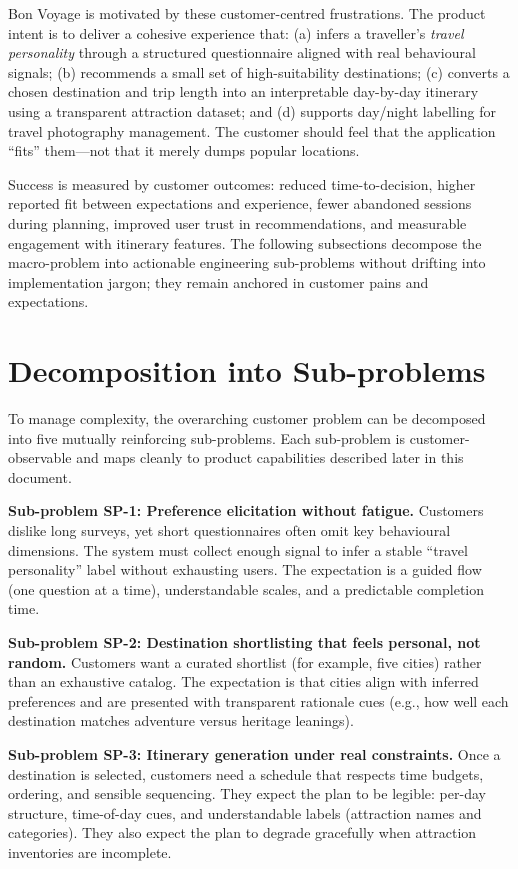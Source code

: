 \documentclass[12pt,oneside,openany]{report}
\begin{document}
Bon Voyage is motivated by these customer-centred frustrations. The product intent is to deliver a cohesive experience that: (a) infers a traveller's \emph{travel personality} through a structured questionnaire aligned with real behavioural signals; (b) recommends a small set of high-suitability destinations; (c) converts a chosen destination and trip length into an interpretable day-by-day itinerary using a transparent attraction dataset; and (d) supports day/night labelling for travel photography management. The customer should feel that the application ``fits'' them---not that it merely dumps popular locations.

Success is measured by customer outcomes: reduced time-to-decision, higher reported fit between expectations and experience, fewer abandoned sessions during planning, improved user trust in recommendations, and measurable engagement with itinerary features. The following subsections decompose the macro-problem into actionable engineering sub-problems without drifting into implementation jargon; they remain anchored in customer pains and expectations.

\section{Decomposition into Sub-problems}

To manage complexity, the overarching customer problem can be decomposed into five mutually reinforcing sub-problems. Each sub-problem is customer-observable and maps cleanly to product capabilities described later in this document.

\textbf{Sub-problem SP-1: Preference elicitation without fatigue.} Customers dislike long surveys, yet short questionnaires often omit key behavioural dimensions. The system must collect enough signal to infer a stable ``travel personality'' label without exhausting users. The expectation is a guided flow (one question at a time), understandable scales, and a predictable completion time.

\textbf{Sub-problem SP-2: Destination shortlisting that feels personal, not random.} Customers want a curated shortlist (for example, five cities) rather than an exhaustive catalog. The expectation is that cities align with inferred preferences and are presented with transparent rationale cues (e.g., how well each destination matches adventure versus heritage leanings).

\textbf{Sub-problem SP-3: Itinerary generation under real constraints.} Once a destination is selected, customers need a schedule that respects time budgets, ordering, and sensible sequencing. They expect the plan to be legible: per-day structure, time-of-day cues, and understandable labels (attraction names and categories). They also expect the plan to degrade gracefully when attraction inventories are incomplete.
\end{document}
